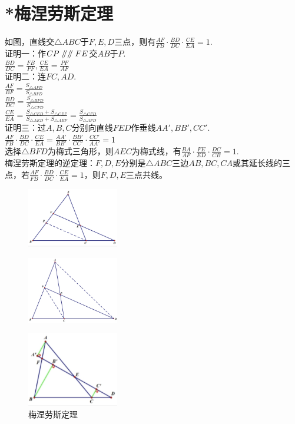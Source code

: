 \documentclass{ecnuthesis}
\newcommand\px{\mathrel{/\mkern-5mu/}}  %
\begin{document}
\section{*梅涅劳斯定理}
\begin{model}
    如图，直线交$\triangle ABC$于$F,E,D$三点，则有$\frac{AF}{FB}·\frac{BD}{DC}·\frac{CE}{EA}=1$. \\
    证明一：作$CP\px \px FE$交$AB$于$P$. \\
    $\frac{BD}{DC}=\frac{FB}{PF},\frac{CE}{EA}=\frac{PF}{AF}$ \\
    证明二：连$FC,AD$. \\
    $\frac{AF}{BF}=\frac{S_{\triangle AFD}}{S_{\triangle BFD}}$ \\
    $\frac{BD}{DC}=\frac{S_{\triangle BFD}}{S_{\triangle CFD}}$ \\
    $\frac{CE}{EA}=\frac{S_{\triangle CED}+S_{\triangle CEF}}{S_{\triangle AED}+S_{\triangle AEF}}=\frac{S_{\triangle CFD}}{S_{\triangle AFD}}$ \\
    证明三：过$A,B,C$分别向直线$FED$作垂线$AA',BB',CC'$. \\
    $\frac{AF}{FB}·\frac{BD}{DC}·\frac{CE}{EA}=\frac{AA'}{BB'}·\frac{BB'}{CC'}·\frac{CC'}{AA'}=1$ \\
    选择$\triangle BFD$为梅式三角形，则$AEC$为梅式线，有$\frac{BA}{AF}·\frac{FE}{ED}·\frac{DC}{CB}=1$. \\
    梅涅劳斯定理的逆定理：$F,D,E$分别是$\triangle ABC$三边$AB,BC,CA$或其延长线的三点，若$\frac{AF}{FB}·\frac{BD}{DC}·\frac{CE}{EA}=1$，则$F,D,E$三点共线。\\
\end{model}
\begin{figure}[H]
\centering
\includegraphics[width=4cm]{picture/841.png}
\end{figure}
\begin{figure}[H]
\centering
\includegraphics[width=4cm]{picture/842.png}
\end{figure}
\begin{figure}[H]
\centering
\includegraphics[width=4cm]{picture/843.png}
\caption{梅涅劳斯定理}
\end{figure}
\clearpage
\end{document}
